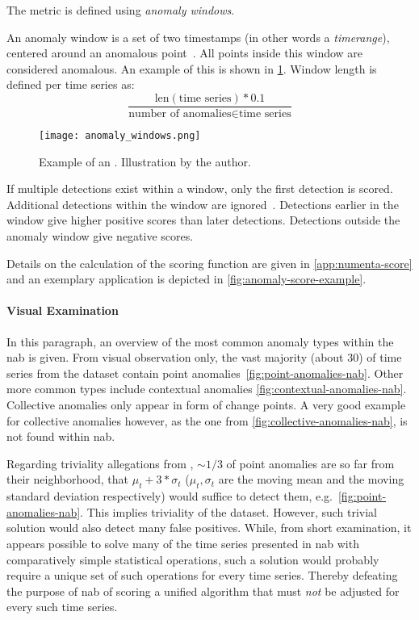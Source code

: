 The metric is defined using \textit{anomaly windows}.
\begin{definition}\label{def:anomaly-window}
    An anomaly window is a set of two timestamps (in other words a \textit{timerange}),
    centered around an anomalous point~\cite[cf.][]{Lavin.2015}. All points inside
    this window are considered anomalous. An example of this is shown in \cref{fig:anomaly-window}.
    Window length is defined per time series as:
    \[\frac{\text{len}(\text{time series}) * 0.1}{\text{number of anomalies}\in \text{time series}}\]
    \begin{figure}[htp!]
        \centering
        \texttt{[image: anomaly\_windows.png]}
        \caption{Example of an . Illustration
        by the author.}\label{fig:anomaly-window}
    \end{figure}
\end{definition}
If multiple detections exist within a window, only the first detection is scored.
Additional detections within the window are ignored~\cite[cf.][]{Lavin.2015}.
Detections earlier in the window give higher positive scores than later detections.
Detections outside the anomaly window give negative scores.

Details on the calculation of the scoring function are given in \cref{app:numenta-score}
and an exemplary application is depicted in \cref{fig:anomaly-score-example}.


\paragraph{Visual Examination}
In this paragraph, an overview of the most common anomaly types within the \gls{nab}
is given. From visual observation only, the vast majority (about 30) of time
series from the dataset contain point anomalies~\cref{fig:point-anomalies-nab}.
Other more common types include contextual anomalies \cref{fig:contextual-anomalies-nab}.
Collective anomalies only appear in form of change points. A very good example
for collective anomalies however, as the one from \cref{fig:collective-anomalies-nab},
is not found within \gls{nab}.

Regarding triviality allegations from \textcite{Lavin.2015}, \(\sim 1/3\) of
point anomalies are so far from their neighborhood, that \(\mu_t + 3*\sigma_t\)
(\(\mu_t, \sigma_t\) are the moving mean and the moving standard deviation
respectively) would suffice to detect them, e.g.\ \cref{fig:point-anomalies-nab}.
This implies triviality of the dataset. However, such trivial solution would
also detect many false positives. While, from short examination, it appears possible
to solve many of the time series presented in \gls{nab} with comparatively simple
statistical operations, such a solution would probably require a unique set of such
operations for every time series. Thereby defeating the purpose of \gls{nab} of
scoring a unified algorithm that must \textit{not} be adjusted for every such
time series.

